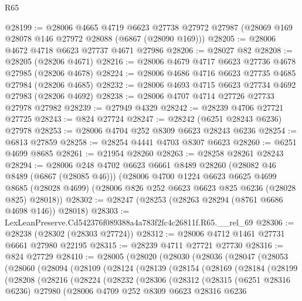 \begin{lexlean}{R65}
\begin{coremodule}
{@28199 := @28006
    @4665
    @4719
    @6623
    @27738
    @27972
    @27987
    (@28069 @169 @28078 @146 @27972 @28088 (@6867 (@28090 @169)))
@28205 := @28006 @4672 @4718 @6623 @27737 @4671 @27986
@28206 := @28027 @82
@28208 := @28205 (@28206 @4671)
@28216 := @28006 @4679 @4717 @6623 @27736 @4678 @27985 (@28206 @4678)
@28224 := @28006 @4686 @4716 @6623 @27735 @4685 @27984 (@28206 @4685)
@28232 := @28006 @4693 @4715 @6623 @27734 @4692 @27983 (@28206 @4692)
@28238 := @28006 @4707 @4714 @27726 @27733 @27978 @27982
@28239 := @27949 @4329
@28242 := @28239 @4706 @27721 @27725
@28243 := @824 @27724
@28247 := @28242 (@6251 @28243 @6236) @27978
@28253 := @28006 @4704 @252 @8309 @6623 @28243 @6236
@28254 := @6813 @27859
@28258 := @28254 @4441 @4703 @8307 @6623
@28260 := @6251 @4699 @8685
@28261 := @21954 @28260
@28263 := @28258 @28261 @28243
@28294 := @28006
    @248
    @4702
    @6623
    @6661
    @8489
    @28260
    (@28082 @46 @8489 (@6867 (@28085 @46)))
    (@28006
      @4700
      @1224
      @6623
      @6625
      @4699
      @8685
      (@28028 @4699)
      (@28006 @826 @252 @6623 @6623 @825 @6236 (@28028 @825) @28018))
@28302 := @28247 (@28253 (@28263 @28294 (@8761 @6686 @4698 @146)) @28018)
@28303 := LexLeanPreserve.Cd542376f089388a4a783f2fc4c26811f.R65.__rel_69
@28306 := @28238 (@28302 (@28303 @27724))
@28312 := @28006 @4712 @1461 @27731 @6661 @27980 @22195
@28315 := @28239 @4711 @27721 @27730
@28316 := @824 @27729
@28410 := @28005
    (@28020
      (@28030
        (@28036
          (@28047
            (@28053
              (@28060
                (@28094
                  (@28109
                    (@28124
                      (@28139
                        (@28154
                          (@28169
                            (@28184
                              (@28199
                                (@28208
                                  (@28216
                                    (@28224
                                      (@28232
                                        (@28306
                                          (@28312
                                            (@28315
                                              (@6251 @28316 @6236)
                                              @27980
                                              (@28006
                                                @4709
                                                @252
                                                @8309
                                                @6623
                                                @28316
                                                @6236
}
\end{coremodule}
\end{lexlean}
